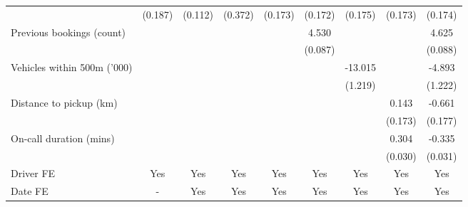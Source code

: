 {\begin{tabular}{l*{8}{S}}
                    &     (0.187)         &     (0.112)         &     (0.372)         &     (0.173)         &     (0.172)         &     (0.175)         &     (0.173)         &     (0.174)         \\
\addlinespace
Previous bookings (count)&                     &                     &                     &                     &       4.530\sym{***}&                     &                     &       4.625\sym{***}\\
                    &                     &                     &                     &                     &     (0.087)         &                     &                     &     (0.088)         \\
\addlinespace
Vehicles within 500m ('000)&                     &                     &                     &                     &                     &     -13.015\sym{***}&                     &      -4.893\sym{***}\\
                    &                     &                     &                     &                     &                     &     (1.219)         &                     &     (1.222)         \\
\addlinespace
Distance to pickup (km)&                     &                     &                     &                     &                     &                     &       0.143         &      -0.661\sym{***}\\
                    &                     &                     &                     &                     &                     &                     &     (0.173)         &     (0.177)         \\
\addlinespace
On-call duration (mins)&                     &                     &                     &                     &                     &                     &       0.304\sym{***}&      -0.335\sym{***}\\
                    &                     &                     &                     &                     &                     &                     &     (0.030)         &     (0.031)         \\
\addlinespace
Driver FE           &       {Yes}         &       {Yes}         &       {Yes}         &       {Yes}         &       {Yes}         &       {Yes}         &       {Yes}         &       {Yes}         \\
\addlinespace
Date FE           &       {-}         &       {Yes}         &       {Yes}         &       {Yes}         &       {Yes}         &       {Yes}         &       {Yes}         &       {Yes}         \\

\end{tabular}}
